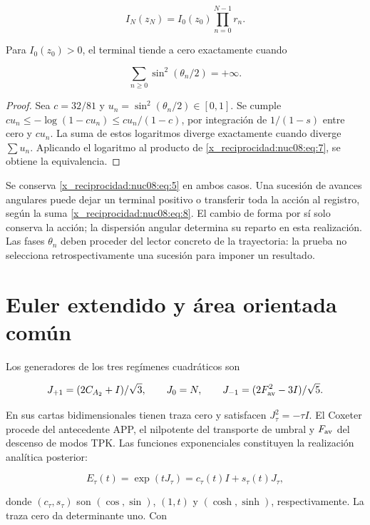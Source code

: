 \begin{equation}
I_N(z_N)=I_0(z_0)\prod_{n=0}^{N-1}r_n.
\label{x_reciprocidad:nuc08:eq:7}
\end{equation}

\begin{theorem}
Para \(I_0(z_0)>0\), el terminal tiende a cero exactamente cuando

\begin{equation}
\sum_{n\ge0}\sin^2(\theta_n/2)=+\infty.
\label{x_reciprocidad:nuc08:eq:8}
\end{equation}
\end{theorem}

\begin{proof}
Sea \(c=32/81\) y \(u_n=\sin^2(\theta_n/2)\in[0,1]\). Se cumple
\(cu_n\leq-\log(1-cu_n)\leq cu_n/(1-c)\), por integración de \(1/(1-s)\) entre cero y \(cu_n\). La suma de estos logaritmos diverge exactamente cuando diverge \(\sum u_n\). Aplicando el logaritmo al producto de \eqref{x_reciprocidad:nuc08:eq:7}, se obtiene la equivalencia.
\end{proof}

Se conserva \eqref{x_reciprocidad:nuc08:eq:5} en ambos casos. Una sucesión de avances angulares puede dejar un terminal positivo o transferir toda la acción al registro, según la suma \eqref{x_reciprocidad:nuc08:eq:8}. El cambio de forma por sí solo conserva la acción; la dispersión angular determina su reparto en esta realización. Las fases \(\theta_n\) deben proceder del lector concreto de la trayectoria: la prueba no selecciona retrospectivamente una sucesión para imponer un resultado.

\section{Euler extendido y área orientada común}

Los generadores de los tres regímenes cuadráticos son

\[
J_{+1}=(2C_{A_2}+I)/\sqrt3,\qquad
J_0=N,\qquad
J_{-1}=(2F_{\rm av}^2-3I)/\sqrt5.
\]

En sus cartas bidimensionales tienen traza cero y satisfacen
\(J_\tau^2=-\tau I\). El Coxeter procede del antecedente APP, el nilpotente del transporte de umbral y \(F_{\rm av}\) del descenso de modos TPK. Las funciones exponenciales constituyen la realización analítica posterior:

\[
E_\tau(t)=\exp(tJ_\tau)=c_\tau(t)I+s_\tau(t)J_\tau,
\]

donde \((c_\tau,s_\tau)\) son \((\cos,\sin)\), \((1,t)\) y \((\cosh,\sinh)\), respectivamente. La traza cero da determinante uno. Con

